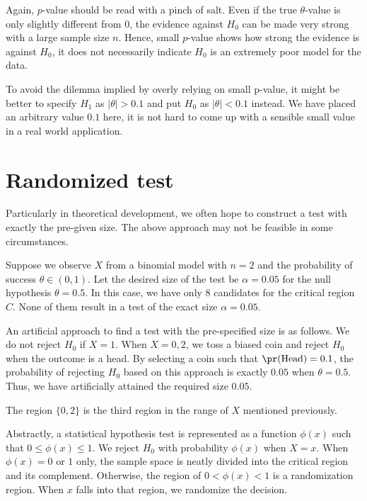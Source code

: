 Again, $p$-value should be read with a pinch of salt. Even if the
true $\theta$-value is only slightly different from $0$, the evidence
against $H_0$ can be made very strong with a large sample size
$n$. Hence, small $p$-value shows how strong the evidence
is against $H_0$, it does not necessarily indicate $H_0$
is an extremely poor model for the data.

To avoid the dilemma implied by overly relying on small p-value, 
it might be better to specify $H_1$ as $|\theta| > 0.1$
and put $H_0$ as $|\theta| < 0.1$ instead.
We have placed an arbitrary value $0.1$ here, it is not hard to
come up with a sensible small value in a real world application.

\section{Randomized test}

Particularly in theoretical development, we often hope to construct
a test with exactly the pre-given size. The above approach may not be feasible
in some circumstances.

\begin{example}
Suppose we observe $X$ from a binomial model
with $n=2$ and the probability of success $\theta \in (0, 1)$. Let the
desired size of the test be $\alpha = 0.05$ for the null hypothesis 
$\theta = 0.5$. 
In this case, we have only 8 candidates for the critical region $C$.
None of them result in a test of the exact size $\alpha = 0.05$. 
\end{example}

An artificial approach to find a test with the pre-specified size is as follows.
We do not reject $H_0$ if $X = 1$.  When $X = 0, 2$, we toss
a biased coin and reject $H_0$ when the outcome is a head.
By selecting a coin such that $\pr (\mbox{Head} ) = 0.1$, the probability
of rejecting $H_0$ based on this approach is exactly $0.05$ when $\theta = 0.5$. 
Thus, we have artificially attained the required size $0.05$.

The region $\{0, 2\}$ is the third region
in the range of $X$ mentioned previously.

Abstractly, a statistical hypothesis test is represented
as a function $\phi(x)$ such that $0 \leq \phi(x) \leq 1$.
We reject $H_0$ with probability $\phi(x)$ when $X = x$.
When $\phi(x) = 0$ or $1$ only, the sample space is neatly divided
into the critical region and its complement. Otherwise, the region
of $0 < \phi (x) < 1$ is a randomization region. When $x$
falls into that region, we randomize the decision.

